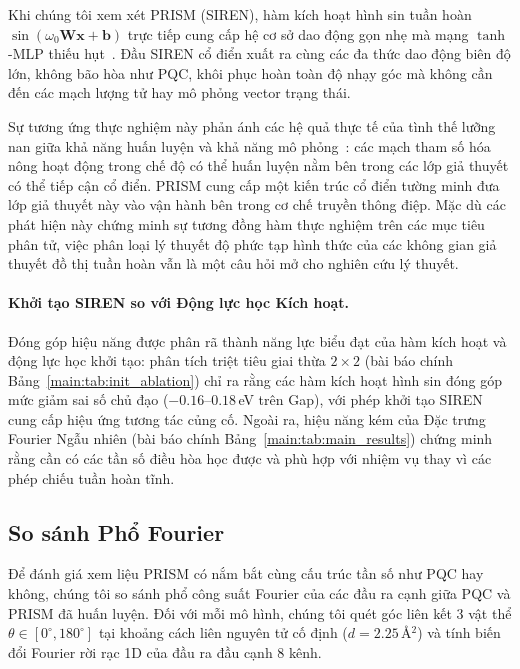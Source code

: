 \documentclass[10pt,twocolumn,letterpaper]{article}
\begin{document}
Khi chúng tôi xem xét PRISM (SIREN), hàm kích hoạt hình sin tuần hoàn $\sin(\omega_0 \mathbf{W} \mathbf{x} + \mathbf{b})$ trực tiếp cung cấp hệ cơ sở dao động gọn nhẹ mà mạng $\tanh$-MLP thiếu hụt~\cite{sitzmann2020siren}. Đầu SIREN cổ điển xuất ra cùng các đa thức dao động biên độ lớn, không bão hòa như PQC, khôi phục hoàn toàn độ nhạy góc mà không cần đến các mạch lượng tử hay mô phỏng vector trạng thái.

Sự tương ứng thực nghiệm này phản ánh các hệ quả thực tế của tình thế lưỡng nan giữa khả năng huấn luyện và khả năng mô phỏng~\cite{Cerezo:2023nqf}: các mạch tham số hóa nông hoạt động trong chế độ có thể huấn luyện nằm bên trong các lớp giả thuyết có thể tiếp cận cổ điển. PRISM cung cấp một kiến trúc cổ điển tường minh đưa lớp giả thuyết này vào vận hành bên trong cơ chế truyền thông điệp. Mặc dù các phát hiện này chứng minh sự tương đồng hàm thực nghiệm trên các mục tiêu phân tử, việc phân loại lý thuyết độ phức tạp hình thức của các không gian giả thuyết đồ thị tuần hoàn vẫn là một câu hỏi mở cho nghiên cứu lý thuyết.

\paragraph{Khởi tạo SIREN so với Động lực học Kích hoạt.}
Đóng góp hiệu năng được phân rã thành năng lực biểu đạt của hàm kích hoạt và động lực học khởi tạo: phân tích triệt tiêu giai thừa $2 \times 2$ (bài báo chính Bảng~\ref{main:tab:init_ablation}) chỉ ra rằng các hàm kích hoạt hình sin đóng góp mức giảm sai số chủ đạo ($-0.16\text{--}0.18$\,eV trên Gap), với phép khởi tạo SIREN cung cấp hiệu ứng tương tác củng cố. Ngoài ra, hiệu năng kém của Đặc trưng Fourier Ngẫu nhiên (bài báo chính Bảng~\ref{main:tab:main_results}) chứng minh rằng cần có các tần số điều hòa học được và phù hợp với nhiệm vụ thay vì các phép chiếu tuần hoàn tĩnh.

\subsection{So sánh Phổ Fourier}

Để đánh giá xem liệu PRISM có nắm bắt cùng cấu trúc tần số như PQC hay không, chúng tôi so sánh phổ công suất Fourier của các đầu ra cạnh giữa PQC và PRISM đã huấn luyện. Đối với mỗi mô hình, chúng tôi quét góc liên kết 3 vật thể $\theta \in [0^\circ, 180^\circ]$ tại khoảng cách liên nguyên tử cố định ($d = 2.25$\,\AA$^2$) và tính biến đổi Fourier rời rạc 1D của đầu ra đầu cạnh 8 kênh.
\end{document}
